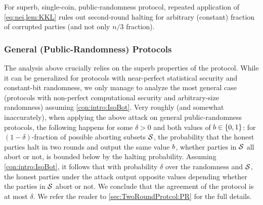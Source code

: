 \begin{remark}
For superb, single-coin, public-randomness protocol, repeated application of \cref{eq:nei,lem:KKL} rules out second-round halting for arbitrary (constant) fraction of corrupted parties (and not only $n/3$ fraction).
\end{remark}

\subsubsection{General (Public-Randomness) Protocols}\label{sec:technique:3:2}
The analysis above crucially relies on the superb properties of the protocol. While it can be generalized for protocols with near-perfect statistical security and constant-bit randomness, we only manage to analyze the most general case (\ie protocols with non-perfect computational security and arbitrary-size randomness) assuming \cref{con:intro:IsoBot}. Very roughly (and somewhat inaccurately), when applying the above attack on general public-randomness protocols, the following happens for some $\delta>0$ and both values of $b\in \{0,1\}$: for $(1-\delta)$-fraction of possible aborting subsets $\mathcal{S}$, the probability that the honest parties halt in two rounds and output the same value $b$, whether parties in $\mathcal{S}$ all abort or not, is bounded below by the halting probability. Assuming \cref{con:intro:IsoBot}, it follows that with probability $\delta$ over the randomness and $\mathcal{S}$, the honest parties under the attack output opposite values depending whether the parties in ${\cal{S}}$ abort or not. We conclude that the agreement of the protocol is at most $\delta$. We refer the reader to \cref{sec:TwoRoundProtcol:PR} for the full details.


